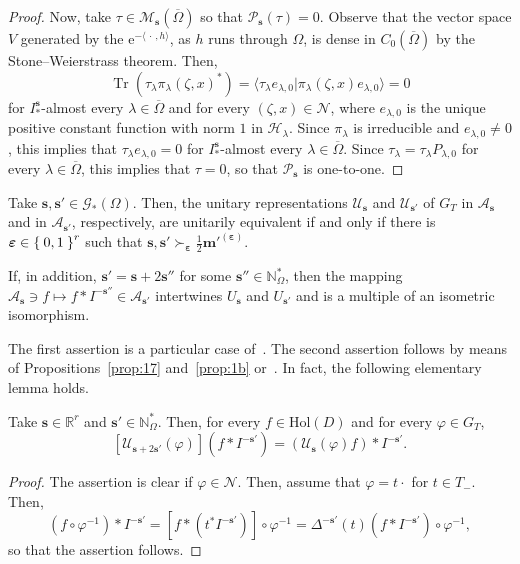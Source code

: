 \documentclass[10.5pt,reqno]{amsart}
\DeclareMathOperator{\tr}{Tr}
\newcommand{\Hol}{\mathrm{Hol}}
\newcommand{\ee}{\mathrm{e}}
\newcommand{\vect}[1]{\mathbf{{#1}}}
\newcommand{\Ms}{\mathscr{M}}
\newcommand{\N}{\mathds{N}}
\newcommand{\R}{\mathds{R}}
\newcommand{\epsb}{\mathbold{\eps}}
\newcommand{\Hs}{\mathscr{H}}
\newcommand{\Ac}{\mathcal{A}}
\newcommand{\Gc}{\mathcal{G}}
\newcommand{\Nc}{\mathcal{N}}
\newcommand{\Pc}{\mathcal{P}}
\newcommand{\Uc}{\mathcal{U}}
\newcommand{\eps}{\varepsilon}
\renewcommand{\phi}{\varphi}
\begin{document}
\begin{proof}
	Now, take $\tau\in \Ms_{\vect s}(\overline{\Omega})$ so that $\Pc_{\vect s}(\tau)=0$. Observe that the vector space $V$ generated by the $\ee^{-\langle \,\cdot\,,h\rangle}$, as $h$ runs through $\Omega$, is dense in $C_0(\overline{\Omega})$ by the Stone--Weierstrass theorem. Then, 
	\[
	\tr(\tau_\lambda \pi_\lambda(\zeta,x)^*)=\langle \tau_\lambda e_{\lambda,0}\vert \pi_\lambda(\zeta,x) e_{\lambda,0}\rangle=0
	\]
	for $I^{\vect s}_*$-almost every $\lambda\in \overline{\Omega}$ and for every $(\zeta,x)\in \Nc$, where $e_{\lambda,0}$ is the unique positive constant function with norm $1$ in $\Hs_\lambda$. Since $\pi_\lambda$ is irreducible and $e_{\lambda,0}\neq 0$, this implies that $\tau_\lambda e_{\lambda,0}=0$ for $I^{\vect s}_*$-almost every $\lambda\in \overline{\Omega}$. Since $\tau_\lambda=\tau_\lambda P_{\lambda,0}$ for   every $\lambda\in \overline{\Omega}$, this implies that $\tau=0$, so that $\Pc_{\vect s}$ is one-to-one.
\end{proof}

\begin{prop}\label{prop:2b}
	Take $\vect s,\vect s'\in \Gc_*(\Omega)$. Then, the unitary representations $\Uc_{\vect s}$ and $\Uc_{\vect s'}$ of $G_T$ in $\Ac_{\vect s}$ and in $\Ac_{\vect s'}$, respectively, are unitarily equivalent if and only if there is $\epsb\in \Set{0,1}^r$ such that $\vect s,\vect s'\succ_{\epsb} \frac 1 2 \vect m'^{(\epsb)}$. 
	
	If, in addition, $\vect s'=\vect s+2 \vect s''$ for some $\vect s''\in \N_\Omega^*$, then the mapping $\Ac_{\vect s}\ni  f\mapsto f*I^{-\vect s''}\in \Ac_{\vect s'} $ intertwines $U_{\vect s}$ and $U_{\vect s'}$ and is a multiple of an isometric isomorphism.
\end{prop}

The first assertion is a particular case of~\cite[Theorem 5.3]{Ishi3}. The second assertion follows by means of Propositions~\ref{prop:17} and~\ref{prop:1b} or~\cite[Theorem 4.6]{Ishi5}. In fact, the following elementary lemma holds.

\begin{lem}\label{lem:1}
	Take $\vect s\in \R^r$ and $\vect{s'}\in \N_{\Omega}^*$. Then, for every $f\in \Hol(D)$ and for every $\phi\in G_T$,
	\[
	[\Uc_{\vect s+2 \vect{s'}}(\phi)](f*I^{-\vect{s'}})=(\Uc_{\vect s}(\phi) f)*I^{-\vect{s'}}.
	\]
\end{lem}

\begin{proof}
	The assertion is clear if $\phi\in \Nc$. Then, assume that $\phi=t\cdot$ for $t\in T_-$. Then,
	\[
	(f\circ \phi^{-1})* I^{-\vect{s'}}=[f*(t^* I^{-\vect{s'}})]\circ \phi^{-1}=\Delta^{-\vect{s'}}(t)(f* I^{-\vect{s'}})\circ \phi^{-1},
	\]
	so that the assertion follows. 
\end{proof}
\end{document}
